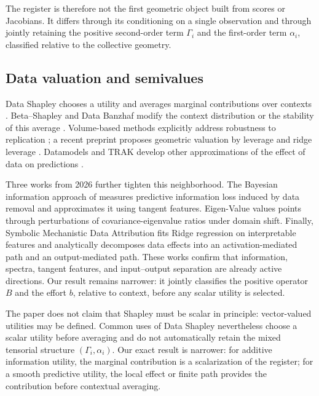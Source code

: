 \documentclass[10pt,a4paper]{article}
\begin{document}
The register is therefore not the first geometric object built from scores or Jacobians. It differs through its conditioning on a single observation and through jointly retaining the positive second-order term $\Gamma_i$ and the first-order term $\alpha_i$, classified relative to the collective geometry.

\subsection{Data valuation and semivalues}
Data Shapley chooses a utility and averages marginal contributions over contexts \citep{ghorbani2019}. Beta--Shapley and Data Banzhaf modify the context distribution or the stability of this average \citep{kwon2022,wang2023banzhaf}. Volume-based methods explicitly address robustness to replication \citep{xu2021volume}; a recent preprint proposes geometric valuation by leverage and ridge leverage \citep{mendozasmith2025}. Datamodels and TRAK develop other approximations of the effect of data on predictions \citep{ilyas2022,park2023trak}.

Three works from 2026 further tighten this neighborhood. The Bayesian information approach of \citet{tailor2026bayesian} measures predictive information loss induced by data removal and approximates it using tangent features. Eigen-Value \citep{choi2026eigenvalue} values points through perturbations of covariance-eigenvalue ratios under domain shift. Finally, Symbolic Mechanistic Data Attribution \citep{habibi2026smda} fits Ridge regression on interpretable features and analytically decomposes data effects into an activation-mediated path and an output-mediated path. These works confirm that information, spectra, tangent features, and input--output separation are already active directions. Our result remains narrower: it jointly classifies the positive operator $B$ and the effort $b$, relative to context, before any scalar utility is selected.

The paper does not claim that Shapley must be scalar in principle: vector-valued utilities may be defined. Common uses of Data Shapley nevertheless choose a scalar utility before averaging and do not automatically retain the mixed tensorial structure $(\Gamma_i,\alpha_i)$. Our exact result is narrower: for additive information utility, the marginal contribution is a scalarization of the register; for a smooth predictive utility, the local effect or finite path provides the contribution before contextual averaging.
\end{document}
